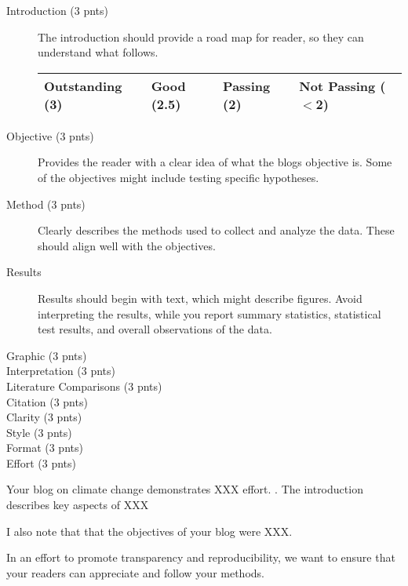 \documentclass{article}\usepackage[]{graphicx}\usepackage[]{color}
\begin{document}
\begin{description}

\item[Introduction (3 pnts)] The introduction should provide a road map for reader, so they can understand what follows.

\begin{tabular}{llll}\hline
Outstanding (3)  & Good (2.5)  & Passing (2)  & Not Passing ($<$2)\\ \hline\hline


\end{tabular}

\item[Objective (3 pnts)] Provides the reader with a clear idea of what the blogs objective is. Some of the objectives might include testing specific hypotheses.

\item[Method (3 pnts)] Clearly describes the methods used to collect and analyze the data. These should align well with the objectives.

\item[Results] Results should begin with text, which might describe figures. Avoid interpreting the results, while you report summary statistics, statistical test results, and overall observations of the data.

\item[Graphic (3 pnts)]

\item[Interpretation (3 pnts)]

\item[Literature Comparisons (3 pnts)]

\item[Citation (3 pnts)]

\item[Clarity (3 pnts)]

\item[Style (3 pnts)]

\item[Format (3 pnts)]

\item[Effort (3 pnts)]

\end{description}

Your blog on climate change demonstrates XXX effort. 
.
The introduction describes key aspects of XXX

I also note that that the objectives of your blog were XXX.

In an effort to promote transparency and reproducibility, we want to ensure that your readers can appreciate and follow your methods. 
\end{document}
